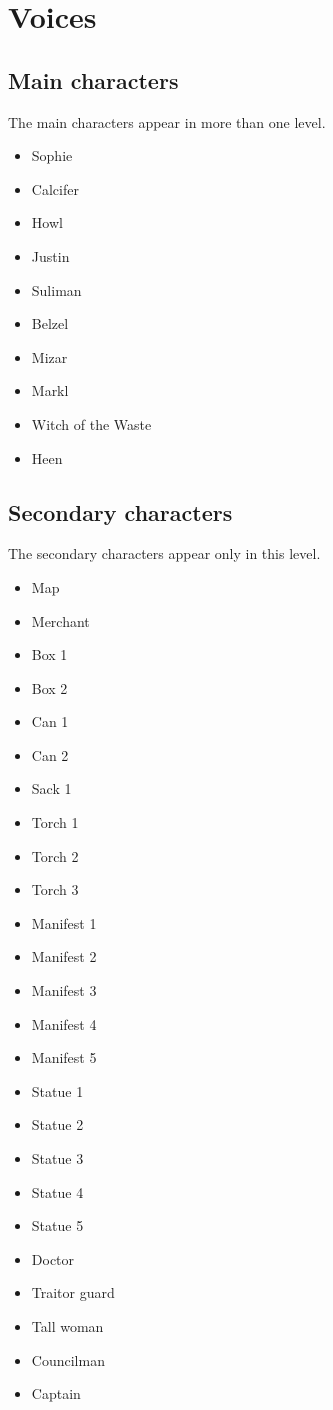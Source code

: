 \section{Voices}

\subsection{Main characters}
The main characters appear in more than one level.
\begin{itemize}
	\item Sophie
	\item Calcifer
	\item Howl
	\item Justin
	\item Suliman
	\item Belzel
	\item Mizar
	\item Markl
	\item Witch of the Waste
	\item Heen
\end{itemize}

\subsection{Secondary characters}
The secondary characters appear only in this level.
\begin{itemize}
	\item Map
	\item Merchant
	\item Box 1
	\item Box 2
	\item Can 1
	\item Can 2
	\item Sack 1
	\item Torch 1
	\item Torch 2
	\item Torch 3
	\item Manifest 1
	\item Manifest 2
	\item Manifest 3
	\item Manifest 4
	\item Manifest 5
	\item Statue 1
	\item Statue 2
	\item Statue 3
	\item Statue 4
	\item Statue 5
	\item Doctor
	\item Traitor guard
	\item Tall woman
	\item Councilman
	\item Captain
\end{itemize}

